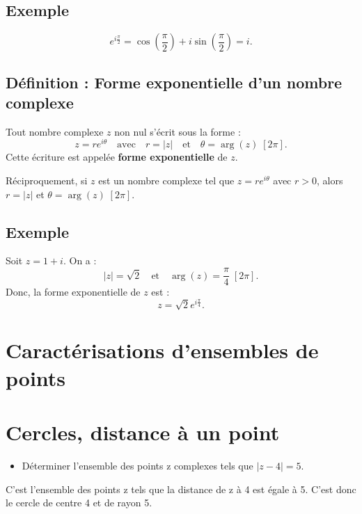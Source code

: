 \documentclass[a4paper,12pt]{article}
\begin{document}
    \subsection{Exemple}

    \[
        e^{i\frac{\pi}{2}} = \cos\left(\frac{\pi}{2}\right) + i\sin\left(\frac{\pi}{2}\right) = i.
    \]

    \subsection{Définition : Forme exponentielle d’un nombre complexe}

    Tout nombre complexe $z$ non nul s’écrit sous la forme :
    \[
        z = r e^{i\theta} \quad \text{avec} \quad r = |z| \quad \text{et} \quad \theta = \arg(z) \; [2\pi].
    \]
    Cette écriture est appelée \textbf{forme exponentielle} de $z$.

    Réciproquement, si $z$ est un nombre complexe tel que $z = r e^{i\theta}$ avec $r > 0$, alors $r = |z|$ et $\theta = \arg(z) \; [2\pi]$.

    \subsection{Exemple}

    Soit $z = 1 + i$. On a :
    \[
        |z| = \sqrt{2} \quad \text{et} \quad \arg(z) = \frac{\pi}{4} \; [2\pi].
    \]
    Donc, la forme exponentielle de $z$ est :
    \[
        z = \sqrt{2} e^{i\frac{\pi}{4}}.
    \]

    \section*{Caractérisations d'ensembles de points}
    \section{Cercles, distance à un point}
    \begin{itemize}
        \item Déterminer l'ensemble des points z complexes tels que $|z - 4| = 5$.
    \end{itemize}
    C'est l'ensemble des points z tels que la distance de z à 4 est égale à 5.
    C'est donc le cercle de centre 4 et de rayon 5.
\end{document}
